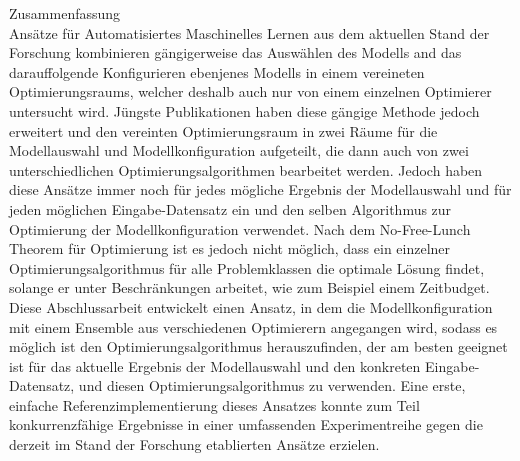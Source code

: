{Zusammenfassung}\label{sec:abstract-ger}
\vspace*{5mm}\\
Ansätze für Automatisiertes Maschinelles Lernen aus dem aktuellen Stand der Forschung kombinieren gängigerweise das Auswählen des Modells and das darauffolgende Konfigurieren ebenjenes Modells in einem vereineten Optimierungsraums, welcher deshalb auch nur von einem einzelnen Optimierer untersucht wird.
Jüngste Publikationen haben diese gängige Methode jedoch erweitert und den vereinten Optimierungsraum in zwei Räume für die Modellauswahl und Modellkonfiguration aufgeteilt, die dann auch von zwei unterschiedlichen Optimierungsalgorithmen bearbeitet werden.
Jedoch haben diese Ansätze immer noch für jedes mögliche Ergebnis der Modellauswahl und für jeden möglichen Eingabe-Datensatz ein und den selben Algorithmus zur Optimierung der Modellkonfiguration verwendet.
Nach dem No-Free-Lunch Theorem für Optimierung ist es jedoch nicht möglich, dass ein einzelner Optimierungsalgorithmus für alle Problemklassen die optimale Lösung findet, solange er unter Beschränkungen arbeitet, wie zum Beispiel einem Zeitbudget.
Diese Abschlussarbeit entwickelt einen Ansatz, in dem die Modellkonfiguration mit einem Ensemble aus verschiedenen Optimierern angegangen wird, sodass es möglich ist den Optimierungsalgorithmus herauszufinden, der am besten geeignet ist für das aktuelle Ergebnis der Modellauswahl und den konkreten Eingabe-Datensatz, und diesen Optimierungsalgorithmus zu verwenden.
Eine erste, einfache Referenzimplementierung dieses Ansatzes konnte zum Teil konkurrenzfähige Ergebnisse in einer umfassenden Experimentreihe gegen die derzeit im Stand der Forschung etablierten Ansätze erzielen.
